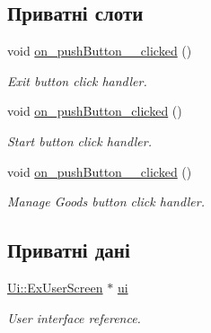 \subsection*{Приватні слоти}
\begin{DoxyCompactItemize}
\item 
\hypertarget{classExUserScreen_a30a26ad349a33bac86a0848934c55655}{void \hyperlink{classExUserScreen_a30a26ad349a33bac86a0848934c55655}{on\-\_\-push\-Button\-\_\-\_\-clicked} ()}\label{classExUserScreen_a30a26ad349a33bac86a0848934c55655}

\begin{DoxyCompactList}\small\item\em Exit button click handler. \end{DoxyCompactList}\item 
\hypertarget{classExUserScreen_a4c7d4f567fc5d87bf459c4fe9ae09411}{void \hyperlink{classExUserScreen_a4c7d4f567fc5d87bf459c4fe9ae09411}{on\-\_\-push\-Button\-\_\-clicked} ()}\label{classExUserScreen_a4c7d4f567fc5d87bf459c4fe9ae09411}

\begin{DoxyCompactList}\small\item\em Start button click handler. \end{DoxyCompactList}\item 
\hypertarget{classExUserScreen_ad5eeeac687e031eb0b722957b20191cf}{void \hyperlink{classExUserScreen_ad5eeeac687e031eb0b722957b20191cf}{on\-\_\-push\-Button\-\_\-\_\-clicked} ()}\label{classExUserScreen_ad5eeeac687e031eb0b722957b20191cf}

\begin{DoxyCompactList}\small\item\em Manage Goods button click handler. \end{DoxyCompactList}\end{DoxyCompactItemize}
\subsection*{Приватні дані}
\begin{DoxyCompactItemize}
\item 
\hypertarget{classExUserScreen_abed6a95638d506058d3b1e6e69a42788}{\hyperlink{classUi_1_1ExUserScreen}{Ui\-::\-Ex\-User\-Screen} $\ast$ \hyperlink{classExUserScreen_abed6a95638d506058d3b1e6e69a42788}{ui}}\label{classExUserScreen_abed6a95638d506058d3b1e6e69a42788}

\begin{DoxyCompactList}\small\item\em User interface reference. \end{DoxyCompactList}\end{DoxyCompactItemize}


